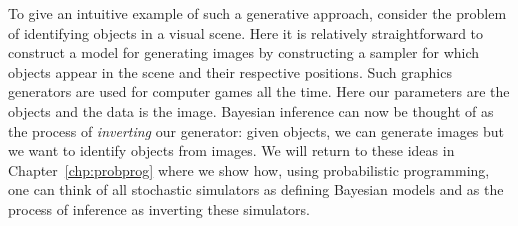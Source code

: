 To give an intuitive example of such a generative approach, consider the problem of identifying objects in
a visual scene.  Here it is relatively straightforward to construct a model for generating images by
constructing a sampler for which objects appear in the scene and their respective positions.  Such
graphics generators are used for computer games all the time.  Here our parameters are the objects and
the data is the image.  Bayesian inference can now be thought of as the process of \emph{inverting} our generator:
given objects, we can generate images but we want to identify objects from images.  We will return
to these ideas in Chapter~\ref{chp:probprog} where we show how, using probabilistic programming,
one can think of all stochastic simulators as defining Bayesian models and as the process of inference as
inverting these simulators.